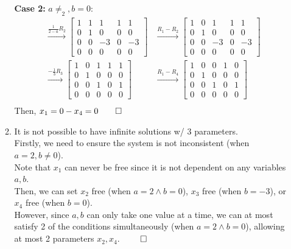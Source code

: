 \documentclass[12pt, a4paper]{article}
\begin{document}
\begin{enumerate}[Q\arabic*.]
\begin{enumerate}[(\alph*)]
        \textbf{Case 2:} $a\neq_2, b=0$:
        \begin{align*}
          \xrightarrow{\frac{1}{2-a}R_2}
          \begin{bmatrix}
            1&1&1&1&1\\
            0&1&0&0&0\\
            0&0&-3&0&-3\\
            0&0&0&0&0
          \end{bmatrix}
          &\xrightarrow{R_1-R_2}
          \begin{bmatrix}
            1&0&1&1&1\\
            0&1&0&0&0\\
            0&0&-3&0&-3\\
            0&0&0&0&0
          \end{bmatrix}\\
          \xrightarrow{-\frac{1}{3}R_3}
          \begin{bmatrix}
            1&0&1&1&1\\
            0&1&0&0&0\\
            0&0&1&0&1\\
            0&0&0&0&0
          \end{bmatrix}
          &\xrightarrow{R_1-R_4}
          \begin{bmatrix}
            1&0&0&1&0\\
            0&1&0&0&0\\
            0&0&1&0&1\\
            0&0&0&0&0
          \end{bmatrix}\\
        \end{align*}
        Then, $x_1 = 0 - x_4 = 0 \qed$  
      \item It is not possible to have infinite solutions w/ 3 parameters. \\Firstly, we need to ensure the system is not inconsistent (when $a=2, b\neq 0$). \\Note that $x_1$ can never be free since it is not dependent on any variables $a, b$. \\Then, we can set $x_2$ free (when $a = 2 \land b=0$), $x_3$ free (when $b=-3$), or $x_4$ free (when $b=0$). \\
        However, since $a, b$ can only take one value at a time, we can at most satisfy 2 of the conditions simultaneously (when $a=2 \land b=0$), allowing at most 2 parameters $x_2, x_4$. $\qed$ 
    \end{enumerate}
    \pagebreak


\end{enumerate}
\end{document}
